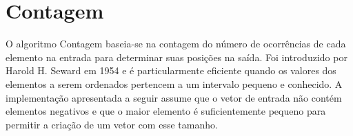 \section{Contagem}
O algoritmo Contagem baseia-se na contagem do número de ocorrências de cada elemento na entrada para determinar suas posições na saída. Foi introduzido por Harold H. Seward em 1954 e é particularmente eficiente quando os valores dos elementos a serem ordenados pertencem a um intervalo pequeno e conhecido. A implementação apresentada a seguir assume que o vetor de entrada não contém elementos negativos e que o maior elemento é suficientemente pequeno para permitir a criação de um vetor com esse tamanho.

